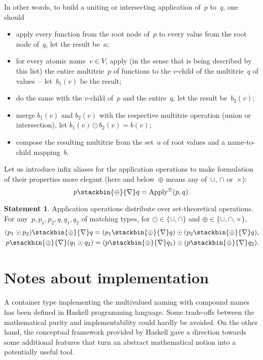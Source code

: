 \documentclass{article}
\theoremstyle{definition}
\newtheorem{St}{Statement}
\newcommand{\apply}{\operatorname{Apply}}
\newcommand{\inapply}[1]{\stackbin{#1}{\nabla}}
\begin{document}
In other words, to build a uniting or intersecting application of~$p$ to~$q$,
one should
\begin{itemize}
\item apply every function from the root node of~$p$ to every value from
the root node of~$q$, let the result be~$a$;
\item for every atomic name~$v\in V$, apply (in the sense that is being
described by this list) the entire multitrie~$p$ of
functions to the $v$-child of the multitrie~$q$ of values~-- let~$b_1(v)$ be
the result;
\item do the same with the $v$-child of~$p$ and the entire~$q$, let the result
be~$b_2(v)$;
\item merge $b_1(v)$ and $b_2(v)$ with the respective multitrie operation
(union or intersection), let $b_1(v)\odot b_2(v) = b(v)$;
\item compose the resulting multitrie from the set~$a$ of root values and a
name-to-child mapping~$b$.
\end{itemize}

Let us introduce infix aliases for the application operations to make
formulation of their properties more elegant (here and below~$\oplus$ means any
of~$\cup$, $\cap$ or~$\times$):
\[
  p \inapply{\oplus} q = \apply^{\oplus} (p, q) .
\]

\begin{St}\label{st:apply-distr}
Application operations distribute over set-theoretical operations.
For any~$p, p_1, p_2, q, q_1, q_2$ of matching types,
for $\odot \in \{\cup, \cap \}$ and $\oplus \in \{\cup, \cap, \times \}$,
\begin{eqnarray*}
  (p_1 \odot p_2) \inapply{\oplus} q =
    (p_1 \inapply{\oplus} q) \odot (p_2 \inapply{\oplus} q) , \\
  p \inapply{\oplus} (q_1 \odot q_2) =
    (p \inapply{\oplus} q_1) \odot (p \inapply{\oplus} q_2) .
\end{eqnarray*}
\end{St}

\section{Notes about implementation}

A container type implementing the multivalued naming with compound names has
been defined in Haskell programming language. Some trade-offs between the
mathematical purity and implementability could hardly be avoided. On the other
hand, the conceptual framework provided by Haskell gave a
direction towards some additional features that turn an abstract mathematical
notion into a potentially useful tool.
\end{document}

